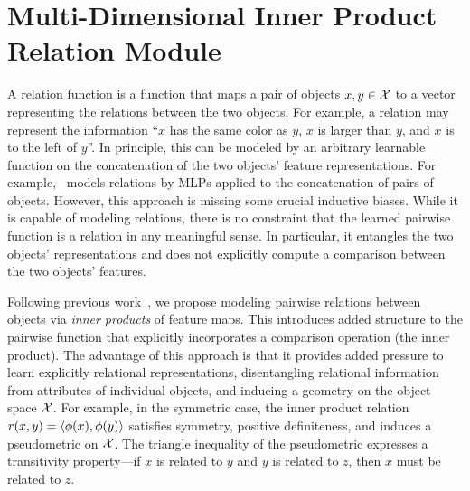 \section{Multi-Dimensional Inner Product Relation Module}\label{sec:mdipr}

A relation function is a function that maps a pair of objects $x, y \in {\mathcal{X}}$ to a vector representing the relations between the two objects. For example, a relation may represent the information ``$x$ has the same color as $y$, $x$ is larger than $y$, and $x$ is to the left of $y$''. In principle, this can be modeled by an arbitrary learnable function on the concatenation of the two objects' feature representations. For example,~\citet{santoroSimpleNeural2017} models relations by MLPs applied to the concatenation of pairs of objects. However, this approach is missing some crucial inductive biases. While it is capable of modeling relations, there is no constraint that the learned pairwise function is a relation in any meaningful sense. In particular, it entangles the two objects' representations and does not explicitly compute a comparison between the two objects' features.

Following previous work~\citep[e.g.,][]{webbEmergentSymbols2021, kergNeuralArchitecture2022, altabaaAbstractorsRelationalCrossattention2024}, we propose modeling pairwise relations between objects via \textit{inner products} of feature maps. This introduces added structure to the pairwise function that explicitly incorporates a comparison operation (the inner product).
The advantage of this approach is that it provides added pressure to learn explicitly relational representations, disentangling relational information from attributes of individual objects, and inducing a geometry on the object space ${\mathcal{X}}$.
For example, in the symmetric case, the inner product relation $r(x,y) = \left \langle \phi(x), \phi(y) \right\rangle$ satisfies symmetry, positive definiteness, and induces a pseudometric on ${\mathcal{X}}$. The triangle inequality of the pseudometric expresses a transitivity property---if $x$ is related to $y$ and $y$ is related to $z$, then $x$ must be related to $z$.

